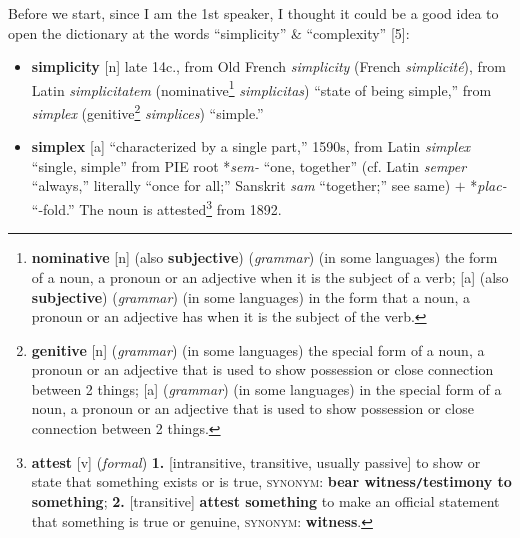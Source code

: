 \documentclass[oneside]{book}
\numberwithin{equation}{section}
\begin{document}
Before we start, since I am the 1st speaker, I thought it could be a good idea to open the dictionary at the words ``simplicity'' \& ``complexity'' [5]:
\begin{itemize}
	\item \textbf{simplicity} [n] late 14c., from Old French \textit{simplicity} (French \textit{simplicit\'e}), from Latin \textit{simplicitatem} (nominative\footnote{\textbf{nominative} [n] (also \textbf{subjective}) (\textit{grammar}) (in some languages) the form of a noun, a pronoun or an adjective when it is the subject of a verb; [a] (also \textbf{subjective}) (\textit{grammar}) (in some languages) in the form that a noun, a pronoun or an adjective has when it is the subject of the verb.} \textit{simplicitas}) ``state of being simple,'' from \textit{simplex} (genitive\footnote{\textbf{genitive} [n] (\textit{grammar}) (in some languages) the special form of a noun, a pronoun or an adjective that is used to show possession or close connection between 2 things; [a] (\textit{grammar}) (in some languages) in the special form of a noun, a pronoun or an adjective that is used to show possession or close connection between 2 things.} \textit{simplices}) ``simple.''
	\item \textbf{simplex} [a] ``characterized by a single part,'' 1590s, from Latin \textit{simplex} ``single, simple'' from PIE root *\textit{sem-} ``one, together'' (cf. Latin \textit{semper} ``always,'' literally ``once for all;'' Sanskrit \textit{sam} ``together;'' see same) $+$ *\textit{plac-} ``-fold.'' The noun is attested\footnote{\textbf{attest} [v] (\textit{formal}) \textbf{1.} [intransitive, transitive, usually passive] to show or state that something exists or is true, \textsc{synonym}: \textbf{bear witness\texttt{/}testimony to something}; \textbf{2.} [transitive] \textbf{attest something} to make an official statement that something is true or genuine, \textsc{synonym}: \textbf{witness}.} from 1892.

\end{itemize}
\end{document}
